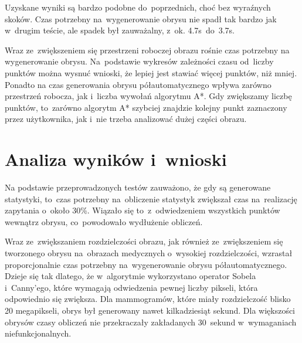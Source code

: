 \documentclass[a4paper,11pt,twoside,openright]{report}
\theoremstyle{definition}
\begin{document}
Uzyskane wyniki są bardzo podobne do~poprzednich, choć bez wyraźnych skoków.
Czas potrzebny na~wygenerowanie obrysu nie spadł tak bardzo jak w~drugim teście,
ale spadek był zauważalny, z~ok. 4.7s~do~3.7s.

Wraz ze~zwiększeniem się przestrzeni roboczej obrazu rośnie czas potrzebny na
wygenerowanie obrysu. Na~podstawie wykresów zależności czasu od~liczby punktów
można wysnuć wnioski, że lepiej jest stawiać więcej punktów, niż mniej. Ponadto na czas generowania
obrysu półautomatycznego wpływa zarówno przestrzeń robocza, jak i~liczba wywołań algorytmu A*. Gdy zwiększamy
liczbę punktów, to~zarówno algorytm A* szybciej znajdzie kolejny punkt zaznaczony przez użytkownika, jak i~nie
trzeba analizować dużej części obrazu.

\section {Analiza wyników i~wnioski}


Na podstawie przeprowadzonych testów
zauważono, że gdy są generowane statystyki, to~czas potrzebny na~obliczenie statystyk
zwiększał czas na~realizację zapytania o~około 30\%. Wiązało się to~z~odwiedzeniem
wszystkich punktów wewnątrz obrysu, co~powodowało wydłużenie obliczeń.

Wraz ze~zwiększaniem rozdzielczości obrazu, jak również ze~zwiększeniem się
tworzonego obrysu na~obrazach medycznych o~wysokiej rozdzielczości, wzrastał proporcjonalnie
czas potrzebny na~wygenerowanie obrysu półautomatycznego. Dzieje się tak dlatego,
że w~algorytmie wykorzystano operator Sobela i~Canny'ego, które wymagają odwiedzenia
pewnej liczby pikseli, która odpowiednio się zwiększa. Dla mammogramów, które miały rozdzielczość
blisko 20 megapikseli, obrys był generowany nawet kilkadziesiąt sekund. Dla większości obrysów
czasy obliczeń nie przekraczały zakładanych 30~sekund w~wymaganiach niefunkcjonalnych.
\end{document}
